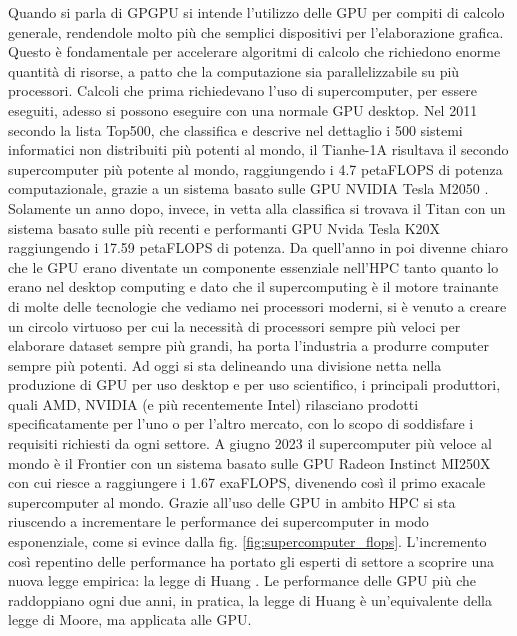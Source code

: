 Quando si parla di \gls{GPGPU} si intende l'utilizzo delle GPU per compiti di calcolo generale, rendendole molto più che semplici dispositivi per l'elaborazione grafica. Questo è fondamentale per accelerare algoritmi di calcolo che richiedono enorme quantità di risorse, a patto che la computazione sia parallelizzabile su più processori.
Calcoli che prima richiedevano l'uso di supercomputer, per essere eseguiti, adesso si possono eseguire con una normale GPU desktop. 
Nel 2011 secondo la lista Top500, che classifica e descrive nel dettaglio i 500 sistemi informatici non distribuiti più potenti al mondo, il Tianhe-1A risultava il secondo supercomputer più potente al mondo, raggiungendo i 4.7 petaFLOPS di potenza computazionale, grazie a un sistema basato sulle GPU NVIDIA Tesla M2050 \cite[]{Tianhe-1A:link}. Solamente un anno dopo, invece, in vetta alla classifica si trovava il Titan \cite[]{Titan:link} con un sistema basato sulle più recenti e performanti GPU Nvida Tesla K20X raggiungendo i 17.59 petaFLOPS di potenza.
Da quell'anno in poi divenne chiaro che le GPU erano diventate un componente essenziale nell'HPC tanto quanto lo erano nel desktop computing e dato che il supercomputing è il motore trainante di molte delle tecnologie che vediamo nei processori moderni, si è venuto a creare un circolo virtuoso per cui la necessità di processori sempre più veloci per elaborare dataset sempre più grandi, ha porta l'industria a produrre computer sempre più potenti. Ad oggi si sta delineando una divisione netta nella produzione di GPU per uso desktop e per uso scientifico, i principali produttori, quali AMD, NVIDIA (e più recentemente Intel) rilasciano prodotti specificatamente per l'uno o per l'altro mercato, con lo scopo di soddisfare i requisiti richiesti da ogni settore. A giugno 2023 il supercomputer più veloce al mondo è il Frontier \cite[]{Frontier:link} con un sistema basato sulle GPU Radeon Instinct MI250X con cui riesce a raggiungere i 1.67 exaFLOPS, divenendo così il primo exacale supercomputer al mondo. Grazie all'uso delle GPU in ambito HPC si sta riuscendo a incrementare le performance dei supercomputer in modo esponenziale, come si evince dalla fig. \ref{fig:supercomputer_flops}. L'incremento così repentino delle performance ha portato gli esperti di settore a scoprire una nuova legge empirica: la legge di Huang \cite[]{Huang:law}. Le performance delle GPU più che raddoppiano ogni due anni, in pratica, la legge di Huang è un'equivalente della legge di Moore, ma applicata alle GPU.

